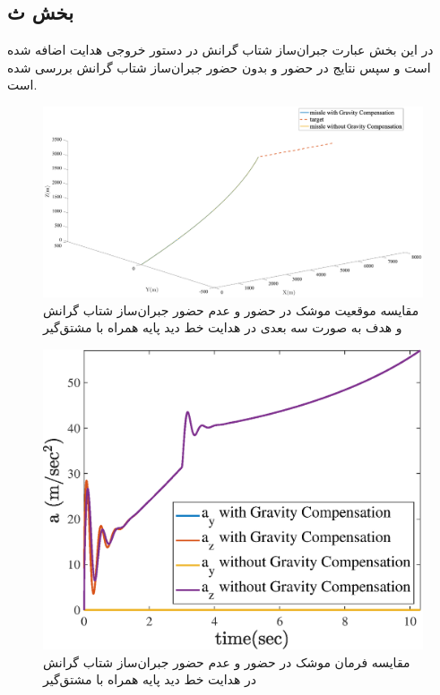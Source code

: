 \subsection{بخش ث}
در این بخش عبارت جبران‌ساز شتاب گرانش در دستور خروجی هدایت اضافه شده است و سپس نتایج در حضور و بدون حضور جبران‌ساز شتاب گرانش  بررسی شده است.

\begin{figure}[H]
	\centering
	\includegraphics[width=\linewidth]{../Figure/e/3DoF_missle_vs_target_state}
	\caption{مقایسه موقعیت موشک در حضور و عدم حضور  جبران‌ساز شتاب گرانش و هدف به صورت سه بعدی  در هدایت خط دید پایه همراه با مشتق‌گیر}
\end{figure}

\begin{figure}[H]
	\centering
	\includegraphics[width=.75\linewidth]{../Figure/e/command}
	\caption{مقایسه فرمان موشک در حضور و عدم حضور  جبران‌ساز شتاب گرانش در هدایت خط دید پایه همراه با مشتق‌گیر}
\end{figure}

